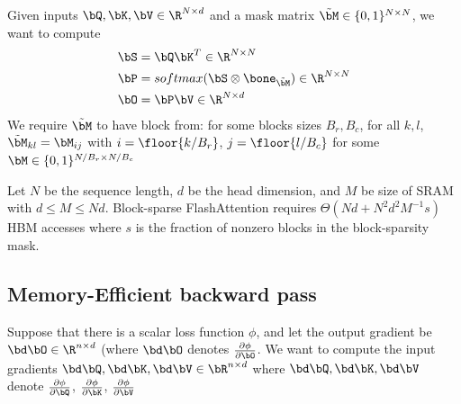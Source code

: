 \documentclass[11pt]{article}
\begin{document}
Given inputs \(\bQ,\bK,\bV\in\R^{N\times d}\) and a mask matrix \(\tilde{\bM}\in\{0,1\}^{N\times N}\),
we want to compute
\begin{align*}
\bS&=\bQ\bK^T\in\R^{N\times N}\\
\bP&=softmax(\bS\otimes\bone_{\tilde{\bM}})\in\R^{N\times N}\\
\bO&=\bP\bV\in\R^{N\times d}
\end{align*}
We require \(\tilde{\bM}\) to have block from: for some blocks sizes \(B_r,B_c\), for all \(k,l\),
\(\tilde{\bM}_{kl}=\bM_{ij}\) with \(i=\floor{k/B_r}\), \(j=\floor{l/B_c}\) for some
\(\bM\in\{0,1\}^{N/B_r\times N/B_c}\)

\begin{proposition}[]
Let \(N\) be the sequence length, \(d\) be the head dimension, and \(M\) be size of SRAM with
\(d\le M\le Nd\). Block-sparse FlashAttention requires \(\Theta(Nd+N^2d^2M^{-1}s)\) HBM accesses where
\(s\) is the fraction of nonzero blocks in the block-sparsity mask. 
\end{proposition}
\subsection{Memory-Efficient backward pass}
\label{sec:org9c004b8}
Suppose that there is a scalar loss function \(\phi\), and let the output gradient be
\(\bd\bO\in\R^{n\times d}\) (where \(\bd\bO\) denotes \(\frac{\partial\phi}{\partial\bO}\). We want to
compute the input gradients  \(\bd\bQ,\bd\bK,\bd\bV\in\bR^{n\times d}\) where \(\bd\bQ,\bd\bK,\bd\bV\)
denote \(\frac{\partial \phi}{\partial\bQ}\), \(\frac{\partial\phi}{\partial\bK}\),
\(\frac{\partial\phi}{\partial\bV}\)
\end{document}
